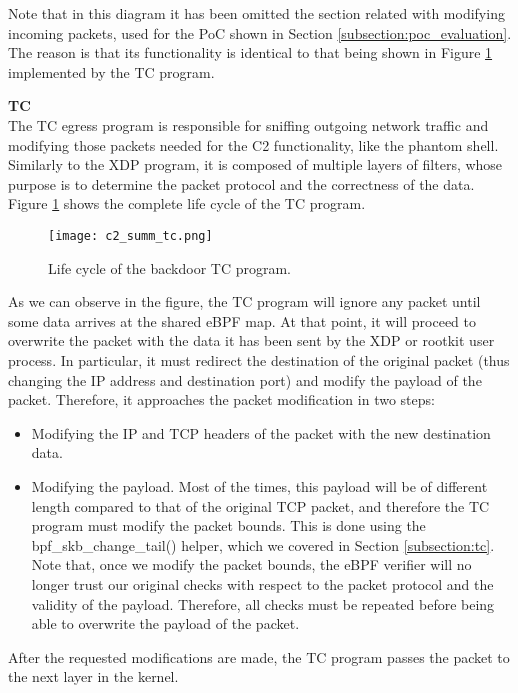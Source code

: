 Note that in this diagram it has been omitted the section related with modifying incoming packets, used for the PoC shown in Section \ref{subsection:poc_evaluation}. The reason is that its functionality is identical to that being shown in Figure \ref{fig:c2_summ_tc} implemented by the TC program.


\textbf{TC}\\
The TC egress program is responsible for sniffing outgoing network traffic and modifying those packets needed for the C2 functionality, like the phantom shell. Similarly to the XDP program, it is composed of multiple layers of filters, whose purpose is to determine the packet protocol and the correctness of the data. Figure \ref{fig:c2_summ_tc} shows the complete life cycle of the TC program.

\begin{figure}[htbp]
	\centering
	\texttt{[image: c2\_summ\_tc.png]}
	\caption{Life cycle of the backdoor TC program.}
	\label{fig:c2_summ_tc}
\end{figure}

As we can observe in the figure, the TC program will ignore any packet until some data arrives at the shared eBPF map. At that point, it will proceed to overwrite the packet with the data it has been sent by the XDP or rootkit user process. In particular, it must redirect the destination of the original packet (thus changing the IP address and destination port) and modify the payload of the packet. Therefore, it approaches the packet modification in two steps:
\begin{itemize}
\item Modifying the IP and TCP headers of the packet with the new destination data.
\item Modifying the payload. Most of the times, this payload will be of different length compared to that of the original TCP packet, and therefore the TC program must modify the packet bounds. This is done using the bpf\_skb\_change\_tail() helper, which we covered in Section \ref{subsection:tc}. Note that, once we modify the packet bounds, the eBPF verifier will no longer trust our original checks with respect to the packet protocol and the validity of the payload. Therefore, all checks must be repeated before being able to overwrite the payload of the packet.
\end{itemize}

After the requested modifications are made, the TC program passes the packet to the next layer in the kernel.



